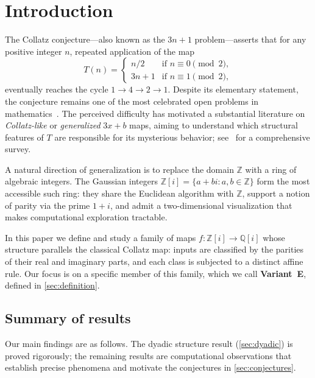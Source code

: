 \documentclass[12pt]{article}
\theoremstyle{plain}
\theoremstyle{definition}
\theoremstyle{remark}
\theoremstyle{definition}
\newcommand{\Z}{\mathbb{Z}}
\newcommand{\Zi}{\mathbb{Z}[i]}
\newcommand{\Qi}{\mathbb{Q}[i]}
\begin{document}
\section{Introduction}

The Collatz conjecture---also known as the $3n+1$ problem---asserts
that for any positive integer $n$, repeated application of the map
\[
    T(n) =
    \begin{cases}
        n/2   & \text{if } n \equiv 0 \pmod{2}, \\
        3n+1  & \text{if } n \equiv 1 \pmod{2},
    \end{cases}
\]
eventually reaches the cycle $1 \to 4 \to 2 \to 1$.
Despite its elementary statement, the conjecture remains one of the
most celebrated open problems in mathematics~\cite{lagarias2010}.
The perceived difficulty has motivated a substantial literature on
\emph{Collatz-like} or \emph{generalized} $3x+b$ maps, aiming to
understand which structural features of $T$ are responsible for its
mysterious behavior; see~\cite{wirsching1998} for a comprehensive
survey.

A natural direction of generalization is to replace the domain
$\Z$ with a ring of algebraic integers.
The Gaussian integers $\Zi = \{a + bi : a,b \in \Z\}$ form the
most accessible such ring: they share the Euclidean algorithm with
$\Z$, support a notion of parity via the prime $1+i$, and admit
a two-dimensional visualization that makes computational exploration
tractable.

In this paper we define and study a family of maps $f: \Zi \to \Qi$
whose structure parallels the classical Collatz map:
inputs are classified by the parities of their real and imaginary
parts, and each class is subjected to a distinct affine rule.
Our focus is on a specific member of this family, which we call
\textbf{Variant~E}, defined in \cref{sec:definition}.

\subsection*{Summary of results}

Our main findings are as follows. The dyadic structure result (\cref{sec:dyadic}) is proved rigorously; the remaining results are computational observations that establish precise phenomena and motivate the conjectures in \cref{sec:conjectures}.
\end{document}
